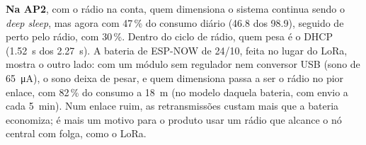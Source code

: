 \textbf{Na AP2}, com o rádio na conta, quem dimensiona o sistema
continua sendo o \emph{deep sleep}, mas agora com 47\,\% do consumo
diário (\SI{46.8}{\mAh} dos \SI{98.9}{\mAh}), seguido de perto pelo rádio,
com 30\,\%. Dentro do ciclo de rádio, quem pesa é o DHCP
(\SI{1,52}{\second} dos \SI{2,27}{\second}). A bateria de ESP-NOW de 24/10,
feita no lugar do LoRa, mostra o outro lado: com um módulo sem regulador
nem conversor USB (sono de \SI{65}{\micro\ampere}), o sono deixa de pesar,
e quem dimensiona passa a ser o rádio no pior enlace, com 82\,\% do
consumo a \SI{18}{\metre} (no modelo daquela bateria, com envio a cada
\SI{5}{\minute}). Num enlace ruim, as retransmissões custam mais que a
bateria economiza; é mais um motivo para o produto usar um rádio que
alcance o nó central com folga, como o LoRa.
